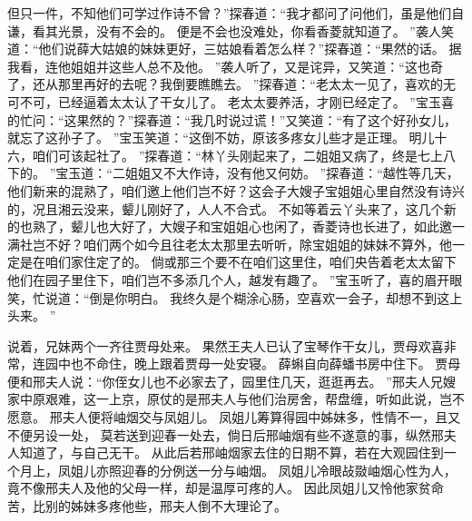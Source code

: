 但只一件，不知他们可学过作诗不曾？”探春道：“我才都问了问他们，虽是他们自谦，看其光景，没有不会的。
便是不会也没难处，你看香菱就知道了。
”袭人笑道：“他们说薛大姑娘的妹妹更好，三姑娘看着怎么样？”探春道：“果然的话。
据我看，连他姐姐并这些人总不及他。
”袭人听了，又是诧异，又笑道：“这也奇了，还从那里再好的去呢？我倒要瞧瞧去。
”探春道：“老太太一见了，喜欢的无可不可，已经逼着太太认了干女儿了。
老太太要养活，才刚已经定了。
”宝玉喜的忙问：“这果然的？”探春道：“我几时说过谎！”又笑道：“有了这个好孙女儿，就忘了这孙子了。
”宝玉笑道：“这倒不妨，原该多疼女儿些才是正理。
明儿十六，咱们可该起社了。
”探春道：“林丫头刚起来了，二姐姐又病了，终是七上八下的。
”宝玉道：“二姐姐又不大作诗，没有他又何妨。
”探春道：“越性等几天，他们新来的混熟了，咱们邀上他们岂不好？这会子大嫂子宝姐姐心里自然没有诗兴的，况且湘云没来，颦儿刚好了，人人不合式。
不如等着云丫头来了，这几个新的也熟了，颦儿也大好了，大嫂子和宝姐姐心也闲了，香菱诗也长进了，如此邀一满社岂不好？咱们两个如今且往老太太那里去听听，除宝姐姐的妹妹不算外，他一定是在咱们家住定了的。
倘或那三个要不在咱们这里住，咱们央告着老太太留下他们在园子里住下，咱们岂不多添几个人，越发有趣了。
”宝玉听了，喜的眉开眼笑，忙说道：“倒是你明白。
我终久是个糊涂心肠，空喜欢一会子，却想不到这上头来。
”\par
说着，兄妹两个一齐往贾母处来。
果然王夫人已认了宝琴作干女儿，贾母欢喜非常，连园中也不命住，晚上跟着贾母一处安寝。
薛蝌自向薛蟠书房中住下。
贾母便和邢夫人说：“你侄女儿也不必家去了，园里住几天，逛逛再去。
”邢夫人兄嫂家中原艰难，这一上京，原仗的是邢夫人与他们治房舍，帮盘缠，听如此说，岂不愿意。
邢夫人便将岫烟交与凤姐儿。
凤姐儿筹算得园中姊妹多，性情不一，且又不便另设一处，
莫若送到迎春一处去，倘日后邢岫烟有些不遂意的事，纵然邢夫人知道了，与自己无干。
从此后若邢岫烟家去住的日期不算，若在大观园住到一个月上，凤姐儿亦照迎春的分例送一分与岫烟。
凤姐儿冷眼敁敠岫烟心性为人，竟不像邢夫人及他的父母一样，却是温厚可疼的人。
因此凤姐儿又怜他家贫命苦，比别的姊妹多疼他些，邢夫人倒不大理论了。
\par
